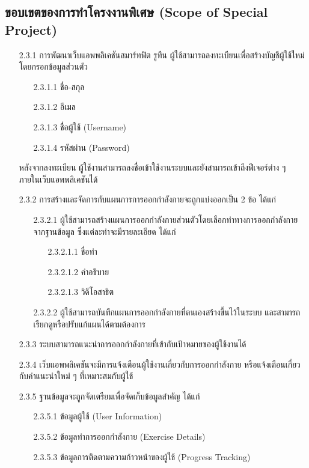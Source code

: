 \documentclass[12pt,a4paper]{article}
\begin{document}
\subsection{ขอบเขตของการทำโครงงานพิเศษ (Scope of Special Project)}
\begin{enumerate}
    \item[2.3.1] การพัฒนาเว็บแอพพลิเคชันสมาร์ทฟิต รูทีน ผู้ใช้สามารถลงทะเบียนเพื่อสร้างบัญชีผู้ใช้ใหม่ โดยกรอกข้อมูลส่วนตัว
    \begin{enumerate}
        \item[2.3.1.1] ชื่อ-สกุล
        \item[2.3.1.2] อีเมล
        \item[2.3.1.3] ชื่อผู้ใช้ (Username)
        \item[2.3.1.4] รหัสผ่าน (Password)
    \end{enumerate}
    หลังจากลงทะเบียน ผู้ใช้งานสามารถลงชื่อเข้าใช้งานระบบและยังสามารถเข้าถึงฟีเจอร์ต่าง ๆ ภายในเว็บแอพพลิเคชันได้
    
    \item[2.3.2] การสร้างและจัดการกับแผนการการออกกำลังกายจะถูกแบ่งออกเป็น 2 ข้อ ได้แก่
    \begin{enumerate}
        \item[2.3.2.1] ผู้ใช้สามารถสร้างแผนการออกกำลังกายส่วนตัวโดยเลือกท่าทางการออกกำลังกายจากฐานข้อมูล ซึ่งแต่ละท่าจะมีรายละเอียด ได้แก่
        \begin{enumerate}
            \item[2.3.2.1.1] ชื่อท่า
            \item[2.3.2.1.2] คำอธิบาย
            \item[2.3.2.1.3] วิดีโอสาธิต
        \end{enumerate}
        \item[2.3.2.2] ผู้ใช้สามารถบันทึกแผนการออกกำลังกายที่ตนเองสร้างขึ้นไว้ในระบบ และสามารถเรียกดูหรือปรับแก้แผนได้ตามต้องการ
    \end{enumerate}
    
    \item[2.3.3] ระบบสามารถแนะนำการออกกำลังกายที่เข้ากับเป้าหมายของผู้ใช้งานได้
    \item[2.3.4] เว็บแอพพลิเคชันจะมีการแจ้งเตือนผู้ใช้งานเกี่ยวกับการออกกำลังกาย หรือแจ้งเตือนเกี่ยวกับคำแนะนำใหม่ ๆ ที่เหมาะสมกับผู้ใช้
    \item[2.3.5] ฐานข้อมูลจะถูกจัดเตรียมเพื่อจัดเก็บข้อมูลสำคัญ ได้แก่
    \begin{enumerate}
        \item[2.3.5.1] ข้อมูลผู้ใช้ (User Information)
        \item[2.3.5.2] ข้อมูลท่าการออกกำลังกาย (Exercise Details)
        \item[2.3.5.3] ข้อมูลการติดตามความก้าวหน้าของผู้ใช้ (Progress Tracking)
    \end{enumerate}
\end{enumerate}
\end{document}
